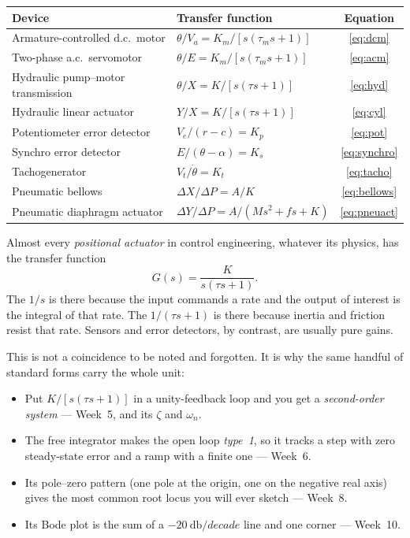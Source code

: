 \documentclass[11pt,a4paper]{article}
\begin{document}
\begin{center}
\begin{tabular}{@{}llc@{}}
\toprule
\textbf{Device} & \textbf{Transfer function} & \textbf{Equation}\\
\midrule
Armature-controlled d.c.\ motor & $\theta/V_a = K_m/[s(\tau_m s+1)]$ & \eqref{eq:dcm}\\
Two-phase a.c.\ servomotor & $\theta/E = K_m/[s(\tau_m s+1)]$ & \eqref{eq:acm}\\
Hydraulic pump--motor transmission & $\theta/X = K/[s(\tau s+1)]$ & \eqref{eq:hyd}\\
Hydraulic linear actuator & $Y/X = K/[s(\tau s+1)]$ & \eqref{eq:cyl}\\
\addlinespace
Potentiometer error detector & $V_e/(r-c)=K_p$ & \eqref{eq:pot}\\
Synchro error detector & $E/(\theta-\alpha)=K_s$ & \eqref{eq:synchro}\\
Tachogenerator & $V_t/\dot\theta = K_t$ & \eqref{eq:tacho}\\
Pneumatic bellows & $\Delta X/\Delta P = A/K$ & \eqref{eq:bellows}\\
\addlinespace
Pneumatic diaphragm actuator & $\Delta Y/\Delta P = A/(Ms^2+fs+K)$ & \eqref{eq:pneuact}\\
\bottomrule
\end{tabular}
\end{center}

\begin{keyidea}
Almost every \emph{positional actuator} in control engineering, whatever its
physics, has the transfer function
\[
  G(s)=\frac{K}{s(\tau s+1)} .
\]
The $1/s$ is there because the input commands a rate and the output of interest
is the integral of that rate. The $1/(\tau s+1)$ is there because inertia and
friction resist that rate. Sensors and error detectors, by contrast, are
usually pure gains.
\end{keyidea}

This is not a coincidence to be noted and forgotten. It is why the same handful
of standard forms carry the whole unit:
\begin{itemize}[leftmargin=*]
\item Put $K/[s(\tau s+1)]$ in a unity-feedback loop and you get a
      \emph{second-order system} --- Week~5, and its $\zeta$ and $\omega_n$.
\item The free integrator makes the open loop \emph{type~1}, so it tracks a
      step with zero steady-state error and a ramp with a finite one --- Week~6.
\item Its pole--zero pattern (one pole at the origin, one on the negative real
      axis) gives the most common root locus you will ever sketch --- Week~8.
\item Its Bode plot is the sum of a $-\SI{20}{\decibel/decade}$ line and one
      corner --- Week~10.
\end{itemize}
\end{document}
